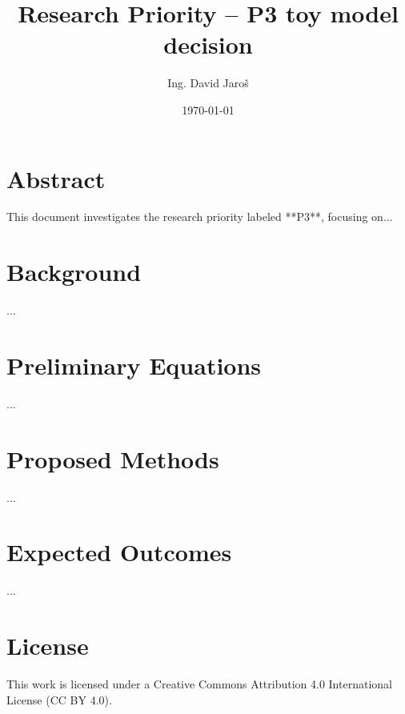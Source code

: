 \documentclass[12pt]{article}
\title{Research Priority – P3 toy model decision}
\author{Ing. David Jaroš}
\date{\today}
\begin{document}
\maketitle

\section*{Abstract}
This document investigates the research priority labeled **P3**, focusing on...

\section*{Background}
...

\section*{Preliminary Equations}
...

\section*{Proposed Methods}
...

\section*{Expected Outcomes}
...


\section*{License}
This work is licensed under a Creative Commons Attribution 4.0 International License (CC BY 4.0).
\end{document}
